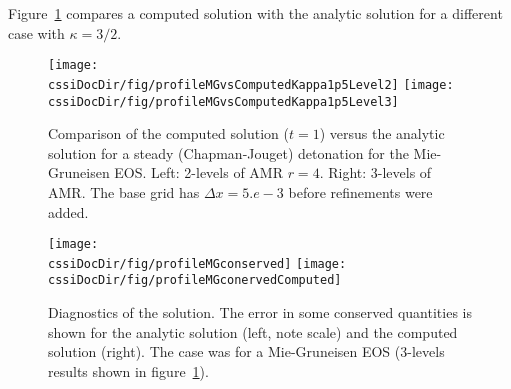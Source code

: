 \documentclass{article}
\newcommand{\obDir}{\homeHenshaw/res/OverBlown}
\newcommand{\cssiDocDir}{../cssi}
\begin{document}
Figure~\ref{fig:detonationCJComparisonKappa1p5} compares a computed solution with the analytic solution for
a different case with $\kappa=3/2$.
\begin{figure}[hbt]
\begin{center}
  \texttt{[image: \\cssiDocDir/fig/profileMGvsComputedKappa1p5Level2]}
  \texttt{[image: \\cssiDocDir/fig/profileMGvsComputedKappa1p5Level3]}
 \end{center}
\caption{Comparison of the computed solution ($t=1$) versus the analytic solution for a steady (Chapman-Jouget) detonation for the Mie-Gruneisen EOS. Left: 2-levels of AMR $r=4$. Right: 3-levels of AMR. The
base grid has $\Delta x = 5.e-3$ before refinements were added.} \label{fig:detonationCJComparisonKappa1p5}
\end{figure}
% 



\begin{figure}[hbt]
\begin{center}
  \texttt{[image: \\cssiDocDir/fig/profileMGconserved]}
  \texttt{[image: \\cssiDocDir/fig/profileMGconervedComputed]}
 \end{center}
\caption{Diagnostics of the solution. The error in some conserved quantities is shown for
   the analytic solution (left, note scale) and the computed solution (right). The case was for a 
    Mie-Gruneisen EOS (3-levels results shown in figure~\ref{fig:detonationCJComparisonKappa1p5}). } 
   \label{fig:detonationConserved}
\end{figure}

% 
\end{document}
